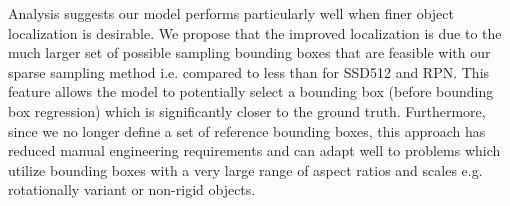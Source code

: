 \documentclass[10pt,twocolumn]{article}
\begin{document}
Analysis suggests our model performs particularly well when finer object localization is desirable. We propose that the improved localization is due to the much larger set of possible sampling bounding boxes that are feasible with our sparse sampling method i.e.  compared to less than  for SSD512 and RPN. This feature allows the model to potentially select a bounding box (before bounding box regression) which is significantly closer to the ground truth. Furthermore, since we no longer define a set of reference bounding boxes, this approach has reduced manual engineering requirements and can adapt well to problems which utilize bounding boxes with a very large range of aspect ratios and scales e.g. rotationally variant or non-rigid objects. 

\clearpage
\newpage

{\small


}
\end{document}
